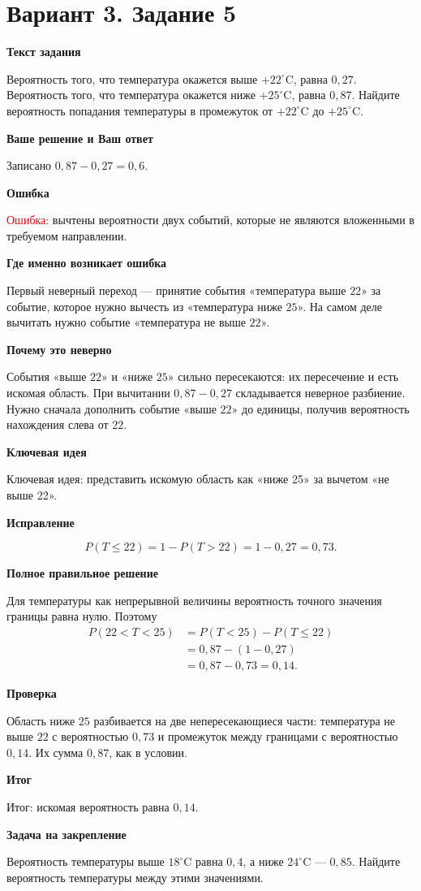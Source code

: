 \documentclass[11pt,a4paper]{article}
\newcommand{\Part}[1]{\par\medskip\noindent\textbf{#1}\par\smallskip}
\newcommand{\Task}[2]{\clearpage\phantomsection\label{task:#1}\section*{#2}}
\newcommand{\Err}[1]{\textcolor{red}{Ошибка:} #1}
\newcommand{\Idea}[1]{\textcolor{blue!60!black}{Ключевая идея:} #1}
\newcommand{\Result}[1]{\textcolor{teal!60!black}{Итог:} #1}
\begin{document}
\Task{v35}{Вариант 3. Задание 5}
\Part{Текст задания}
Вероятность того, что температура окажется выше $+22^\circ\mathrm{C}$, равна $0{,}27$. Вероятность того, что температура окажется ниже $+25^\circ\mathrm{C}$, равна $0{,}87$. Найдите вероятность попадания температуры в промежуток от $+22^\circ\mathrm{C}$ до $+25^\circ\mathrm{C}$.
\Part{Ваше решение и Ваш ответ}
Записано $0{,}87-0{,}27=0{,}6$.
\Part{Ошибка}
\Err{вычтены вероятности двух событий, которые не являются вложенными в требуемом направлении.}
\Part{Где именно возникает ошибка}
Первый неверный переход --- принятие события «температура выше $22$» за событие, которое нужно вычесть из «температура ниже $25$». На самом деле вычитать нужно событие «температура не выше $22$».
\Part{Почему это неверно}
События «выше $22$» и «ниже $25$» сильно пересекаются: их пересечение и есть искомая область. При вычитании $0{,}87-0{,}27$ складывается неверное разбиение. Нужно сначала дополнить событие «выше $22$» до единицы, получив вероятность нахождения слева от $22$.
\Part{Ключевая идея}
\Idea{представить искомую область как «ниже 25» за вычетом «не выше 22».}
\Part{Исправление}
\[P(T\le22)=1-P(T>22)=1-0{,}27=0{,}73.\]
\Part{Полное правильное решение}
Для температуры как непрерывной величины вероятность точного значения границы равна нулю. Поэтому
\[\begin{aligned}
P(22<T<25)&=P(T<25)-P(T\le22)\\
&=0{,}87-(1-0{,}27)\\
&=0{,}87-0{,}73=0{,}14.
\end{aligned}\]
\Part{Проверка}
Область ниже $25$ разбивается на две непересекающиеся части: температура не выше $22$ с вероятностью $0{,}73$ и промежуток между границами с вероятностью $0{,}14$. Их сумма $0{,}87$, как в условии.
\Part{Итог}
\Result{искомая вероятность равна $0{,}14$.}
\Part{Задача на закрепление}
Вероятность температуры выше $18^\circ\mathrm{C}$ равна $0{,}4$, а ниже $24^\circ\mathrm{C}$ --- $0{,}85$. Найдите вероятность температуры между этими значениями.
\end{document}
